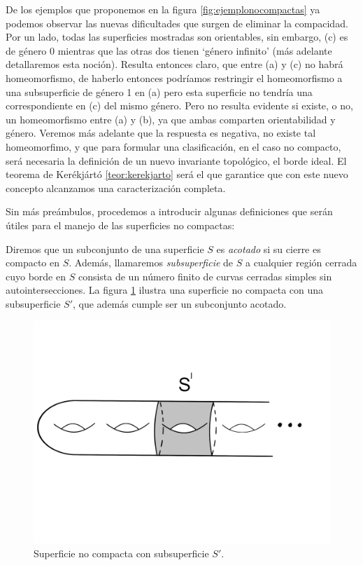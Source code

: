 \documentclass[a4paper,11pt,spanish, twoside, leqno]{tfg-uam}
\theoremstyle{definition}
\begin{document}
De los ejemplos que proponemos en la figura \ref{fig:ejemplonocompactas} ya podemos observar las nuevas dificultades que surgen de eliminar la compacidad. Por un lado, todas las superficies mostradas son orientables, sin embargo, (c) es de género 0 mientras que las otras dos tienen `género infinito' (más adelante detallaremos esta noción). Resulta entonces claro, que entre (a) y (c) no habrá homeomorfismo, de haberlo entonces podríamos restringir el homeomorfismo a una subsuperficie de género 1 en (a) pero esta superficie no tendría una correspondiente en (c) del mismo género. Pero no resulta evidente si existe, o no, un homeomorfismo entre (a) y (b), ya que ambas comparten orientabilidad y género. Veremos más adelante que la respuesta es negativa, no existe tal homeomorfimo, y que para formular una clasificación, en el caso no compacto, será necesaria la definición de un nuevo invariante topológico, el borde ideal. El teorema de Kerékjártó \ref{teor:kerekjarto} será el que  garantice que con este nuevo concepto alcanzamos una caracterización completa.

Sin más preámbulos, procedemos a introducir algunas definiciones que serán útiles para el manejo de las superficies no compactas:

Diremos que un subconjunto de una superficie $S$ es \textit{acotado} si su cierre es compacto en $S$. Además, llamaremos \textit{subsuperficie} de  $S$ a cualquier región cerrada cuyo borde en $S$ consista de un número finito de curvas cerradas simples sin autointersecciones. La figura \ref{fig:ejemplonocompacto} ilustra una superficie no compacta con una subsuperficie $S'$, que además cumple ser un subconjunto acotado. 

\begin{figure}[h!]
	\centering	\includegraphics[width=0.5\linewidth]{imagenes/ejemplonocompacta.png}
	\caption{Superficie no compacta con subsuperficie $S'$.}
	\label{fig:ejemplonocompacto}
\end{figure}
\end{document}
